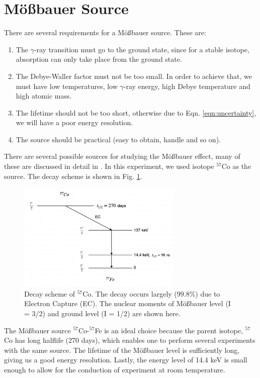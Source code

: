 \documentclass[a4paper]{report}
\numberwithin{equation}{section}
\begin{document}
\section{M\"o{\ss}bauer Source}

There are several requirements for a M\"o{\ss}bauer source. These are: 

\begin{enumerate}
		\item The $\gamma$-ray transition must go to the ground state, since for a stable isotope, absorption can only take place from the ground state.
		\item The Debye-Waller factor must not be too small. In order to achieve that, we must have low temperatures, low $\gamma$-ray energy, high Debye temperature and high atomic mass.
		\item The lifetime should not be too short, otherwise due to Eqn. \ref{eqn:uncertainty}, we will have a poor energy resolution.
		\item The source should be practical (easy to obtain, handle and so on).
\end{enumerate}

There are several possible sources for studying the M\"o{\ss}bauer effect, many of these are discussed in detail in \cite{Schatz1996}. In this experiment, we used isotope $^{57}$Co as the source. The decay scheme is shown in Fig. \ref{fig:decay}.

\begin{figure}[htpb]
    \centering
    \includegraphics[width=0.7\textwidth]{source}
    \caption{Decay scheme of $^{57}$Co. The decay occurs largely (99.8\%) due to Electron Capture (EC). The nuclear moments of M\"o{\ss}bauer level (I = 3/2) and ground level (I = 1/2) are shown here.}
    \label{fig:decay}
\end{figure}	

The M\"o{\ss}bauer source $^{57}$Co-$^{57}$Fe is an ideal choice because the parent isotope, $^{57}$Co has long halflife (270 days), which enables one to perform several experiments with the same source. The lifetime of the M\"o{\ss}bauer level is sufficiently long, giving us a good energy resolution. Lastly, the energy level of 14.4 keV is small enough to allow for the conduction of experiment at room temperature. 
\end{document}
